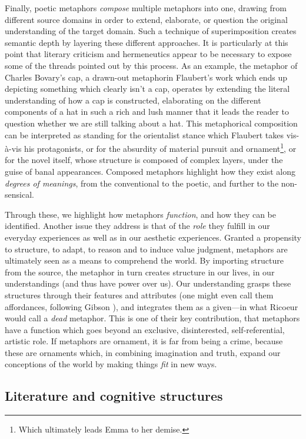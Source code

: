 Finally, poetic metaphors \emph{compose} multiple metaphors into one, drawing from different source domains in order to extend, elaborate, or question the original understanding of the target domain. Such a technique of superimposition creates semantic depth by layering these different approaches. It is particularly at this point that literary criticism and hermeneutics appear to be necessary to expose some of the threads pointed out by this process. As an example, the metaphor of Charles Bovary's cap, a drawn-out metaphorin Flaubert's work which ends up depicting something which clearly isn't a cap, operates by extending the literal understanding of how a cap is constructed, elaborating on the different components of a hat in such a rich and lush manner that it leads the reader to question whether we are still talking about a hat. This metaphorical composition can be interpreted as standing for the orientalist stance which Flaubert takes vis-à-vis his protagonists, or for the absurdity of material pursuit and ornament\footnote{Which ultimately leads Emma to her demise.}, or for the novel itself, whose structure is composed of complex layers, under the guise of banal appearances. Composed metaphors highlight how they exist along \emph{degrees of meanings}, from the conventional to the poetic, and further to the non-sensical.

Through these, we highlight how metaphors \emph{function}, and how they can be identified. Another issue they address is that of the \emph{role} they fulfill in our everyday experiences as well as in our aesthetic experiences. Granted a propensity to structure, to adapt, to reason and to induce value judgment, metaphors are ultimately seen as a means to comprehend the world. By importing structure from the source, the metaphor in turn creates structure in our lives, in our understandings (and thus have power over us). Our understanding grasps these structures through their features and attributes (one might even call them affordances, following Gibson \citep{gibson_ecological_1986}), and integrates them as a given—in what Ricoeur would call a \emph{dead} metaphor. This is one of their key contribution, that metaphors have a function which goes beyond an exclusive, disinterested, self-referential, artistic role. If metaphors are ornament, it is far from being a crime, because these are ornaments which, in combining imagination and truth, expand our conceptions of the world by making things \emph{fit} in new ways.

\subsection{Literature and cognitive structures}
\label{subsec:literature-cognition}

